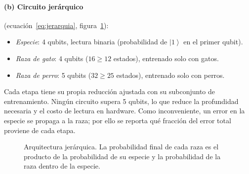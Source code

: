 \documentclass[11pt,letterpaper]{article}
\providecommand{\ket}[1]{\left|#1\right\rangle}
\begin{document}
\paragraph{(b) Circuito jerárquico} (ecuación~\ref{eq:jerarquia}, figura~\ref{fig:jerarquia}):
\begin{itemize}[leftmargin=*]
\item \emph{Especie}: 4 qubits, lectura binaria (probabilidad de $\ket{1}$ en el primer qubit).
\item \emph{Raza de gato}: 4 qubits ($16\geq12$ estados), entrenado solo con gatos.
\item \emph{Raza de perro}: 5 qubits ($32\geq25$ estados), entrenado solo con perros.
\end{itemize}
Cada etapa tiene su propia reducción ajustada con su subconjunto de entrenamiento. Ningún circuito
supera 5 qubits, lo que reduce la profundidad necesaria y el costo de lectura en hardware. Como
inconveniente, un error en la especie se propaga a la raza; por ello se reporta qué fracción del
error total proviene de cada etapa.

\begin{figure}[H]
\centering
{}
\caption{Arquitectura jerárquica. La probabilidad final de cada raza es el producto de la probabilidad
de su especie y la probabilidad de la raza dentro de la especie.}
\label{fig:jerarquia}
\end{figure}
\end{document}
